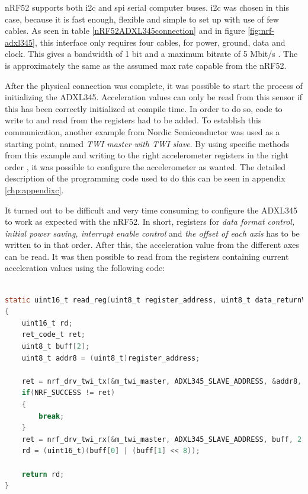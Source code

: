 \noindent \gls{nRF52} supports both \gls{i2c} and \gls{spi} serial computer buses. \gls{i2c} was chosen in this case, because it is fast enough, flexible and simple to set up with use of few cables. As seen in table \ref{nRF52ADXL345connection} and in figure \ref{fig:nrf-adxl345}, this interface only requires four cables, for power, ground, data and clock. This gives a bandwidth of 1 bit and a maximum bitrate of 5 Mbit/s \cite{semiconductors2000i2c}. The is approximately the same as the assumed max rate capable from the \gls{nRF52}. 

\noindent After the physical connection was complete, it was possible to start the process of initializing the \gls{ADXL345}. Acceleration values can only be read from this sensor if this has been correctly initialized at compile time. In order to do so, code to write to and read from the registers had to be added. To establish this communication, another example from Nordic Semiconductor was used as a starting point, named \textit{TWI master with TWI slave}. By using specific methods from this example and writing to the right accelerometer registers in the right order \cite{devices2009digital}, it was possible to configure the accelerometer as wanted. The detailed description of the programming code used to do this can be seen in appendix \ref{chp:appendixc}. 

\noindent It turned out to be difficult and very time consuming to configure the \gls{ADXL345} to work as expected with the \gls{nRF52}. In short, registers for \textit{data format control, initial power saving, interrupt enable control} and \textit{the offset of each axis} has to be written to in that order. After this, the acceleration value from the different axes can be read. It was then possible to read from the registers containing current acceleration values using the following code: 

\begin{lstlisting}[language=C]

static uint16_t read_reg(uint8_t register_address, uint8_t data_returnValue) 
{
	uint16_t rd;
	ret_code_t ret;
	uint8_t buff[2];
    uint8_t addr8 = (uint8_t)register_address;
    
    ret = nrf_drv_twi_tx(&m_twi_master, ADXL345_SLAVE_ADDRESS, &addr8, 1, true);
    if(NRF_SUCCESS != ret)
    {
        break;
    }
    ret = nrf_drv_twi_rx(&m_twi_master, ADXL345_SLAVE_ADDRESS, buff, 2, false);
	rd = (uint16_t)(buff[0] | (buff[1] << 8));
    
    return rd;	
}

\end{lstlisting}


